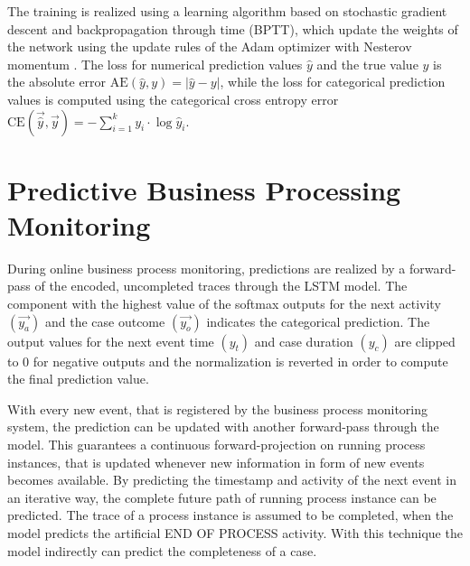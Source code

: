 The training is realized using a learning algorithm based on stochastic gradient descent and backpropagation through time (BPTT), which update the weights of the network using the update rules of the Adam optimizer with Nesterov momentum \cite{dozat2016incorporating}.
The loss for numerical prediction values $\hat{y}$ and the true value $y$ is the absolute error $\text{AE}(\hat{y},y)=|\hat{y} - y|$, while the loss for categorical prediction values is computed using the categorical cross entropy error $\text{CE}(\vec{\hat{y}}, \vec{y}) = - \sum_{i=1}^{k} y_i \cdot \log \hat{y}_i$.

\section{Predictive Business Processing Monitoring}

During online business process monitoring, predictions are realized by a forward-pass of the encoded, uncompleted traces through the LSTM model.
The component with the highest value of the softmax outputs for the next activity $(\vec{y_a})$ and the case outcome $(\vec{y_o})$ indicates the categorical prediction.
The output values for the next event time $(y_t)$ and case duration  $(y_c)$ are clipped to 0 for negative outputs and the normalization is reverted in order to compute the final prediction value.

With every new event, that is registered by the business process monitoring system, the prediction can be updated with another forward-pass through the model.
This guarantees a continuous forward-projection on running process instances, that is updated whenever new information in form of new events becomes available.
By predicting the timestamp and activity of the next event in an iterative way, the complete future path of running process instance can be predicted.
The trace of a process instance is assumed to be completed, when the model predicts the artificial END OF PROCESS activity.
With this technique the model indirectly can predict the completeness of a case.